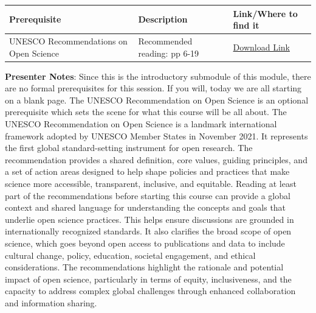 \documentclass[
  letterpaper,
  DIV=11,
  numbers=noendperiod]{scrartcl}
\newcounter{none} %
\begin{document}
{\def\LTcaptype{none} %
\begin{longtable}[]{@{}
  >{\raggedright\arraybackslash}p{}
  >{\raggedright\arraybackslash}p{}
  >{\raggedright\arraybackslash}p{}@{}}
\toprule\noalign{}
\begin{minipage}[b]{\linewidth}\raggedright
Prerequisite
\end{minipage} & \begin{minipage}[b]{\linewidth}\raggedright
Description
\end{minipage} & \begin{minipage}[b]{\linewidth}\raggedright
Link/Where to find it
\end{minipage} \\
\midrule\noalign{}
\endhead
\bottomrule\noalign{}
\endlastfoot
UNESCO Recommendations on Open Science & Recommended reading: pp 6-19 &
\href{https://unesdoc.unesco.org/ark:/48223/pf0000379949}{Download
Link} \\
\end{longtable}
}

\textbf{Presenter Notes}: Since this is the introductory submodule of
this module, there are no formal prerequisites for this session. If you
will, today we are all starting on a blank page. The UNESCO
Recommendation on Open Science is an optional prerequisite which sets
the scene for what this course will be all about. The UNESCO
Recommendation on Open Science is a landmark international framework
adopted by UNESCO Member States in November 2021. It represents the
first global standard-setting instrument for open research. The
recommendation provides a shared definition, core values, guiding
principles, and a set of action areas designed to help shape policies
and practices that make science more accessible, transparent, inclusive,
and equitable. Reading at least part of the recommendations before
starting this course can provide a global context and shared language
for understanding the concepts and goals that underlie open science
practices. This helps ensure discussions are grounded in internationally
recognized standards. It also clarifies the broad scope of open science,
which goes beyond open access to publications and data to include
cultural change, policy, education, societal engagement, and ethical
considerations. The recommendations highlight the rationale and
potential impact of open science, particularly in terms of equity,
inclusiveness, and the capacity to address complex global challenges
through enhanced collaboration and information sharing.
\end{document}
